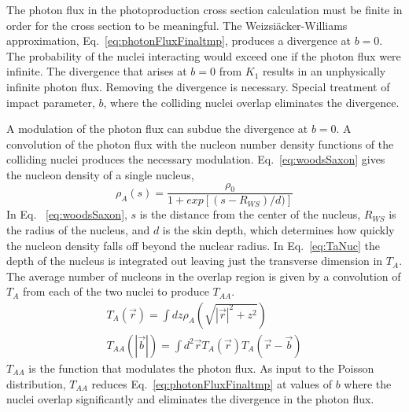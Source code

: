     The photon flux in the photoproduction cross section calculation must be 
      finite in order for the cross section to be meaningful.
    The Weizsi\"{a}cker-Williams approximation, Eq.~\ref{eq:photonFluxFinaltmp}, 
      produces a divergence at $b=0$.
    The probability of the nuclei interacting would exceed one if the photon 
      flux were infinite. 
    The divergence that arises at $b=0$ from $K_{1}$ results in an 
      unphysically infinite photon flux.
    Removing the divergence is necessary.
    Special treatment of impact parameter, $b$, where the colliding nuclei 
      overlap eliminates the divergence. 
    
    A modulation of the photon flux can subdue the divergence at $b=0$.
    A convolution of the photon flux with the nucleon number density functions 
      of the colliding nuclei produces the necessary modulation. 
    Eq.~\ref{eq:woodsSaxon} gives the nucleon density of a single nucleus,
    \begin{equation} 
      \rho_{A}(s)=\frac{\rho_{0}}{1+exp[(s-R_{WS})/d)]}
      \label{eq:woodsSaxon}
    \end{equation}
    In Eq. ~\ref{eq:woodsSaxon}, $s$ is the distance from the center of the 
      nucleus, $R_{WS}$ is the radius of the nucleus, and $d$ is the skin depth, 
      which determines how quickly the nucleon density falls off beyond the 
      nuclear radius. 
    In Eq.~\ref{eq:TaNuc} the depth of the nucleus is integrated out leaving
      just the transverse dimension in $T_{A}$.
    The average number of nucleons in the overlap region is given by a 
      convolution of $T_A$ from each of the two nuclei to produce $T_{AA}$.
    \begin{eqnarray} \label{eq:TaNuc}
      T_{A}(\vec{r})=\int{dz\rho_{A}(\sqrt{|\vec{r}|^{2}+z^{2}})} \nonumber \\ 
      T_{AA}(|\vec{b}|)=\int{d^{2}\vec{r}T_{A}(\vec{r})T_{A}(\vec{r}-\vec{b})}
    \end{eqnarray}
    $T_{AA}$ is the function that modulates the photon flux. 
    As input to the Poisson distribution, $T_{AA}$ reduces 
      Eq.~\ref{eq:photonFluxFinaltmp} at values of $b$ where the nuclei overlap 
      significantly and eliminates the divergence in the photon flux. 
    
